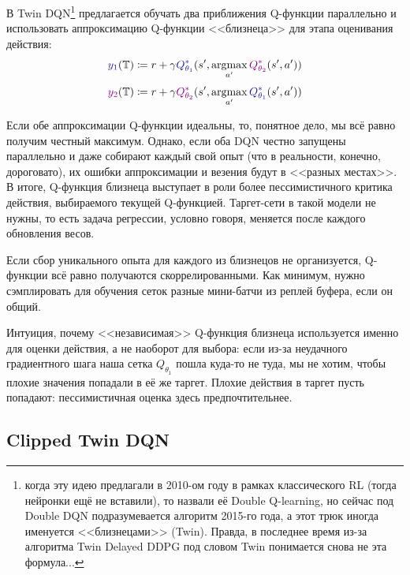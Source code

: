 В Twin DQN\footnote{когда эту идею предлагали в 2010-ом году в рамках классического RL (тогда нейронки ещё не вставили), то назвали её Double Q-learning, но сейчас под Double DQN подразумевается алгоритм 2015-го года, а этот трюк иногда именуется <<близнецами>> (Twin). Правда, в последнее время из-за алгоритма Twin Delayed DDPG под словом Twin понимается снова не эта формула...} предлагается обучать два приближения Q-функции параллельно и использовать аппроксимацию Q-функции <<близнеца>> для этапа оценивания действия:
$$\textcolor{ChadBlue}{y_1}(\T ) \coloneqq r + \gamma \textcolor{ChadBlue}{Q_{\theta_1}^*}(s', \argmax\limits_{a'} \textcolor{ChadPurple}{Q_{\theta_2}^*}(s', a'))$$
$$\textcolor{ChadPurple}{y_2}(\T ) \coloneqq r + \gamma \textcolor{ChadPurple}{Q_{\theta_2}^*}(s', \argmax\limits_{a'} \textcolor{ChadBlue}{Q_{\theta_1}^*}(s', a'))$$

Если обе аппроксимации Q-функции идеальны, то, понятное дело, мы всё равно получим честный максимум. Однако, если оба DQN честно запущены параллельно и даже собирают каждый свой опыт (что в реальности, конечно, дороговато), их ошибки аппроксимации и везения будут в <<разных местах>>. В итоге, Q-функция близнеца выступает в роли более пессимистичного критика действия, выбираемого текущей Q-функцией. Таргет-сети в такой модели не нужны, то есть задача регрессии, условно говоря, меняется после каждого обновления весов.

\begin{remark}
Если сбор уникального опыта для каждого из близнецов не организуется, Q-функции всё равно получаются скоррелированными. Как минимум, нужно сэмплировать для обучения сеток разные мини-батчи из реплей буфера, если он общий.
\end{remark}

Интуиция, почему <<независимая>> Q-функция близнеца используется именно для оценки действия, а не наоборот для выбора: если из-за неудачного градиентного шага наша сетка $Q_{\theta_1}$ пошла куда-то не туда, мы не хотим, чтобы плохие значения попадали в её же таргет. Плохие действия в таргет пусть попадают: пессимистичная оценка здесь предпочтительнее.

\subsection{Clipped Twin DQN}\label{subsec:clippedtwin}

